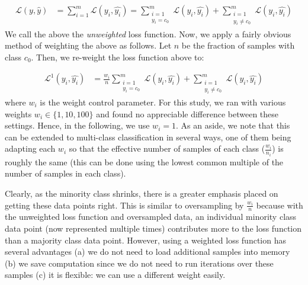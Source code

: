 \documentclass[10pt,compsoc,twocolumn]{IEEEtran}
\begin{document}



\[
    \begin{aligned}
    \mathcal{L}(y, \hat{y}) &= \sum_{i=1}^m \mathcal{L}(y_i, \hat{y_i}) \nonumber = \sum_{\substack{i=1 \\ y_i = c_0}}^m \mathcal{L}(y_i, \hat{y_i}) + \sum_{\substack{i=1 \\ y_i \neq c_0}}^m \mathcal{L}(y_i, \hat{y_i})
    \end{aligned}
\]
We call the above the \textit{unweighted} loss function. Now, we apply a fairly obvious method of weighting the above as follows. Let $n$ be the fraction of samples with class $c_0$. Then, we re-weight the loss function above to:

\begin{equation}\label{eq:w}
\begin{aligned}
    \mathcal{L}^1(y_i, \hat{y_i}) &= \frac{w_i}{n}\sum_{\substack{i=1 \\ y_i = c_0}}^m \mathcal{L}(y_i, \hat{y_i}) + \sum_{\substack{i=1 \\ y_i \neq c_0}}^m \mathcal{L}(y_i, \hat{y_i})
    \end{aligned}
\end{equation}
where $w_i$ is the weight control parameter. For this study, we ran with   various  weights  $w_i  \in \{1,10,100\}$ and found no appreciable difference between these settings. Hence, in the following, we use $w_i=1$. As an aside, we note that this can be extended to multi-class classification in several ways, one of them being adapting each $w_i$ so that the effective number of samples of each class ($\frac{w_i}{n_i}$) is roughly the same (this can be done using the lowest common multiple of the number of samples in each class).


Clearly, as the minority class shrinks, there is a greater emphasis placed on getting these data points right. This is similar to oversampling by $\frac{w_i}{n}$ because with the unweighted loss function and oversampled data, an individual minority class data point (now represented multiple times) contributes more to the loss function than a majority class data point. However, using a weighted loss function has several advantages (a) we do not need to load additional samples into memory (b) we save computation since we do not need to run iterations over these samples (c) it is flexible: we can use a different weight easily.
\end{document}
